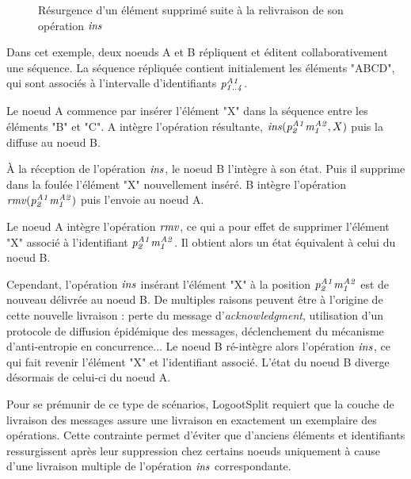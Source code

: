\begin{figure}[!ht]
{
  }
  \caption{Résurgence d'un élément supprimé suite à la relivraison de son opération $\mathit{ins}$}
  \label{fig:why-exactly-once-delivery}
\end{figure}

Dans cet exemple, deux noeuds A et B répliquent et éditent collaborativement une séquence.
La séquence répliquée contient initialement les éléments "ABCD", qui sont associés à l'intervalle d'identifiants $\mathit{p}^{\mathit{A1}}_{\mathit{1..4}}$.

Le noeud A commence par insérer l'élément "X" dans la séquence entre les éléments "B" et "C".
A intègre l'opération résultante, $\mathit{ins}(\mathit{p}^{\mathit{A1}}_{\mathit{2}}\mathit{m}^{\mathit{A2}}_{\mathit{1}},X)$ puis la diffuse au noeud B.

À la réception de l'opération $\mathit{ins}$, le noeud B l'intègre à son état.
Puis il supprime dans la foulée l'élément "X" nouvellement inséré.
B intègre l'opération $\mathit{rmv}(\mathit{p}^{\mathit{A1}}_{\mathit{2}}\mathit{m}^{\mathit{A2}}_{\mathit{1}})$ puis l'envoie au noeud A.

Le noeud A intègre l'opération $\mathit{rmv}$, ce qui a pour effet de supprimer l'élément "X" associé à l'identifiant $\mathit{p}^{\mathit{A1}}_{\mathit{2}}\mathit{m}^{\mathit{A2}}_{\mathit{1}}$.
Il obtient alors un état équivalent à celui du noeud B.

Cependant, l'opération $\mathit{ins}$ insérant l'élément "X" à la position $\mathit{p}^{\mathit{A1}}_{\mathit{2}}\mathit{m}^{\mathit{A2}}_{\mathit{1}}$ est de nouveau délivrée au noeud B.
De multiples raisons peuvent être à l'origine de cette nouvelle livraison : perte du message d'\emph{acknowledgment}, utilisation d'un protocole de diffusion épidémique des messages, déclenchement du mécanisme d'anti-entropie en concurrence...
Le noeud B ré-intègre alors l'opération $\mathit{ins}$, ce qui fait revenir l'élément "X" et l'identifiant associé.
L'état du noeud B diverge désormais de celui-ci du noeud A.

Pour se prémunir de ce type de scénarios, LogootSplit requiert que la couche de livraison des messages assure une livraison en exactement un exemplaire des opérations.
Cette contrainte permet d'éviter que d'anciens éléments et identifiants ressurgissent après leur suppression chez certains noeuds uniquement à cause d'une livraison multiple de l'opération $\mathit{ins}$ correspondante.
